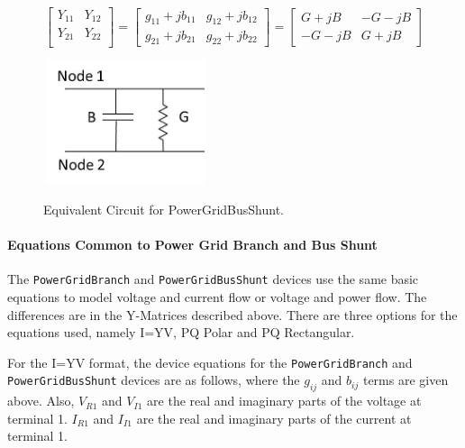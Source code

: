 \begin{equation}
  \left[ \begin{array}{cc} 
         Y_{11} & Y_{12} \\ Y_{21} & Y_{22} \\  
         \end{array} \right] =
  \left[ \begin{array}{cc} 
         g_{11}+jb_{11} & g_{12}+jb_{12} \\  g_{21}+jb_{21} & g_{22}+jb_{22}
         \end{array} \right] =
  \left[ \begin{array}{cc} 
         G+jB & -G-jB \\ -G-jB & G+jB
         \end{array} \right]
\end{equation}
\begin{figure}[ht]
  \centering
  \scalebox{1.0}
  {\includegraphics[width=1.91in,height= 1.43in]{PowerGridBusShunt.jpg}}
  \caption[Equivalent Circuit for PowerGridbusShunt]{Equivalent Circuit for PowerGridBusShunt. \label{figPowerGridBusShunt}}
\end{figure}
\paragraph{Equations Common to Power Grid Branch and Bus Shunt}
The \texttt{PowerGridBranch} and \texttt{PowerGridBusShunt} devices use the same
basic equations to model voltage and current flow or voltage and power flow. The 
differences are in the Y-Matrices described above.  There are three options for 
the equations used, namely I=YV, PQ Polar and PQ Rectangular.

For the I=YV format, the device equations for the \texttt{PowerGridBranch} and 
\texttt{PowerGridBusShunt} devices are as follows, where the $g_{ij}$ and $b_{ij}$ 
terms are given above.  Also, $V_{R1}$ and $V_{I1}$ are the real and imaginary parts 
of the voltage at terminal 1.  $I_{R1}$ and $I_{I1}$ are the real and imaginary parts 
of the current at terminal 1.

